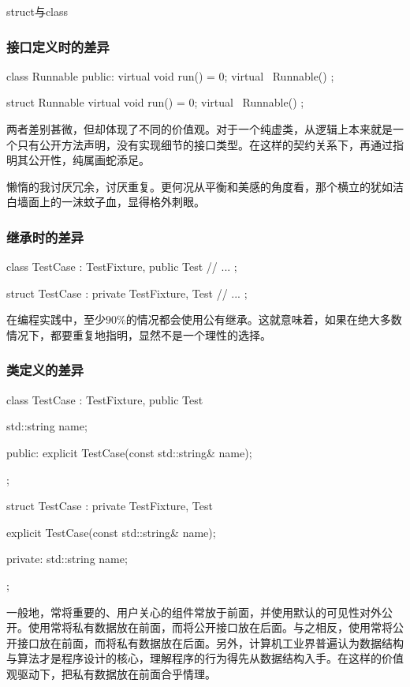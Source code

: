 \begin{content}
\begin{episode}{struct与class}
\begin{content}
\subsubsection{接口定义时的差异}

\begin{c++}
class Runnable {
public:
  virtual void run() = 0;
  virtual ~Runnable() {}
};

struct Runnable {
  virtual void run() = 0;
  virtual ~Runnable() {}
};
\end{c++}

两者差别甚微，但却体现了不同的价值观。对于一个纯虚类，从逻辑上本来就是一个只有公开方法声明，没有实现细节的接口类型。在这样的契约关系下，再通过指明其公开性，纯属画蛇添足。

懒惰的我讨厌冗余，讨厌重复。更何况从平衡和美感的角度看，那个横立的犹如洁白墙面上的一沫蚊子血，显得格外刺眼。

\subsubsection{继承时的差异}

\begin{c++}
class TestCase : TestFixture, public Test {
  // ...
};

struct TestCase : private TestFixture, Test {
  // ...  
};
\end{c++}

在编程实践中，至少$90\%$的情况都会使用公有继承。这就意味着，如果在绝大多数情况下，都要重复地指明，显然不是一个理性的选择。

\subsubsection{类定义的差异}

\begin{c++}
class TestCase : TestFixture, public Test {
  std::string name;

public:
  explicit TestCase(const std::string& name);
};

struct TestCase : private TestFixture, Test {
  explicit TestCase(const std::string& name);

private:
  std::string name;
};
\end{c++}

一般地，常将重要的、用户关心的组件常放于前面，并使用默认的可见性对外公开。使用常将私有数据放在前面，而将公开接口放在后面。与之相反，使用常将公开接口放在前面，而将私有数据放在后面。另外，计算机工业界普遍认为数据结构与算法才是程序设计的核心，理解程序的行为得先从数据结构入手。在这样的价值观驱动下，把私有数据放在前面合乎情理。


\end{content}
\end{episode}
\end{content}
